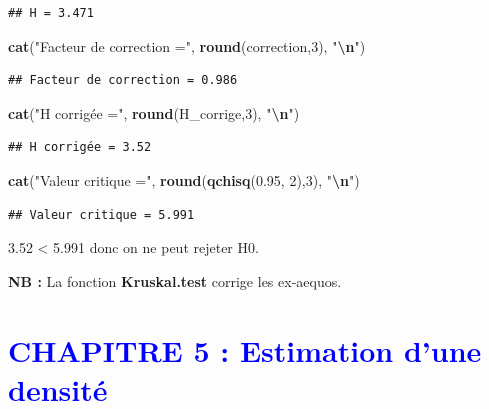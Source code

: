 \documentclass[
  12pt,
]{article}
\newenvironment{Shaded}{\begin{snugshade}}{\end{snugshade}}
\newcommand{\DecValTok}[1]{\textcolor[rgb]{0.00,0.00,0.81}{#1}}
\newcommand{\FloatTok}[1]{\textcolor[rgb]{0.00,0.00,0.81}{#1}}
\newcommand{\FunctionTok}[1]{\textcolor[rgb]{0.13,0.29,0.53}{\textbf{#1}}}
\newcommand{\NormalTok}[1]{#1}
\newcommand{\SpecialCharTok}[1]{\textcolor[rgb]{0.81,0.36,0.00}{\textbf{#1}}}
\newcommand{\StringTok}[1]{\textcolor[rgb]{0.31,0.60,0.02}{#1}}
\begin{document}
\begin{verbatim}
## H = 3.471
\end{verbatim}

\begin{Shaded}
\begin{Highlighting}[]
\FunctionTok{cat}\NormalTok{(}\StringTok{"Facteur de correction ="}\NormalTok{, }\FunctionTok{round}\NormalTok{(correction,}\DecValTok{3}\NormalTok{), }\StringTok{"}\SpecialCharTok{\textbackslash{}n}\StringTok{"}\NormalTok{)}
\end{Highlighting}
\end{Shaded}

\begin{verbatim}
## Facteur de correction = 0.986
\end{verbatim}

\begin{Shaded}
\begin{Highlighting}[]
\FunctionTok{cat}\NormalTok{(}\StringTok{"H corrigée ="}\NormalTok{, }\FunctionTok{round}\NormalTok{(H\_corrige,}\DecValTok{3}\NormalTok{), }\StringTok{"}\SpecialCharTok{\textbackslash{}n}\StringTok{"}\NormalTok{)}
\end{Highlighting}
\end{Shaded}

\begin{verbatim}
## H corrigée = 3.52
\end{verbatim}

\begin{Shaded}
\begin{Highlighting}[]
\FunctionTok{cat}\NormalTok{(}\StringTok{"Valeur critique ="}\NormalTok{, }\FunctionTok{round}\NormalTok{(}\FunctionTok{qchisq}\NormalTok{(}\FloatTok{0.95}\NormalTok{, }\DecValTok{2}\NormalTok{),}\DecValTok{3}\NormalTok{), }\StringTok{"}\SpecialCharTok{\textbackslash{}n}\StringTok{"}\NormalTok{)}
\end{Highlighting}
\end{Shaded}

\begin{verbatim}
## Valeur critique = 5.991
\end{verbatim}

3.52 \textless{} 5.991 donc on ne peut rejeter H0.

\textbf{NB :} La fonction \textbf{Kruskal.test} corrige les ex-aequos.

\newpage

\section{\texorpdfstring{\textcolor{blue}{CHAPITRE 5 : Estimation d'une densité }}{}}\label{section-4}
\end{document}
